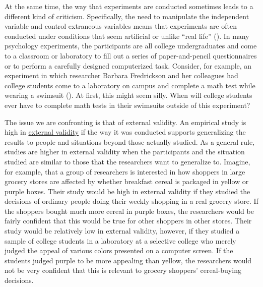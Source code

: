 \documentclass[
]{krantz}
\begin{document}
At the same time, the way that experiments are conducted sometimes leads to a different kind of criticism. Specifically, the need to manipulate the independent variable and control extraneous variables means that experiments are often conducted under conditions that seem artificial or unlike ``real life'' (). In many psychology experiments, the participants are all college undergraduates and come to a classroom or laboratory to fill out a series of paper-and-pencil questionnaires or to perform a carefully designed computerized task. Consider, for example, an experiment in which researcher Barbara Fredrickson and her colleagues had college students come to a laboratory on campus and complete a math test while wearing a swimsuit (). At first, this might seem silly. When will college students ever have to complete math tests in their swimsuits outside of this experiment?

The issue we are confronting is that of external validity. An empirical study is high in \hyperref[external-validity]{external validity} if the way it was conducted supports generalizing the results to people and situations beyond those actually studied. As a general rule, studies are higher in external validity when the participants and the situation studied are similar to those that the researchers want to generalize to. Imagine, for example, that a group of researchers is interested in how shoppers in large grocery stores are affected by whether breakfast cereal is packaged in yellow or purple boxes. Their study would be high in external validity if they studied the decisions of ordinary people doing their weekly shopping in a real grocery store. If the shoppers bought much more cereal in purple boxes, the researchers would be fairly confident that this would be true for other shoppers in other stores. Their study would be relatively low in external validity, however, if they studied a sample of college students in a laboratory at a selective college who merely judged the appeal of various colors presented on a computer screen. If the students judged purple to be more appealing than yellow, the researchers would not be very confident that this is relevant to grocery shoppers' cereal-buying decisions.
\end{document}
